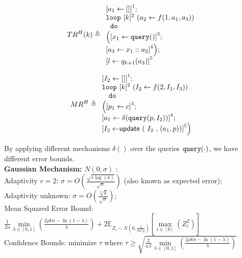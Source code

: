 \documentclass[a4paper,11pt]{article}
\begin{document}
\begin{example}
\[
TR^H(k) \triangleq
{
\begin{array}{l}
    \clabel{a_1 \leftarrow [] }^1; \\
    \eloop ~ [k]^{2} ~ (a_2 \leftarrow f(1, a_1, a_3)) \\
    ~ \edo ~ \\
    \Big(
     \clabel{x_1 \leftarrow \query() }^3 ; \\
    \clabel{a_3 \leftarrow x_1 :: a_2 }^4     \Big);\\
    \clabel{l \leftarrow q_{k + 1}(a_3)}^{5}\\
\end{array}
}
\]
\end{example}
%
\begin{example}
\[
MR^H \triangleq
\begin{array}{l}
    \left[I_2 \leftarrow [] \right]^1; \\
    \eloop ~ [k]^{2} ~ (I_2 \leftarrow f(2, I_1, I_3)) \\ 
    \ ~ \edo ~ \\ \Big(
    \left[p_1 \leftarrow c \right]^3 ; \\
    \left[a_1 \leftarrow \delta(\query(p, I_2)) \right]^4; \\
    \left[I_3 \leftarrow \eupdt( {I_2}, (a_1, p))  \right]^5
    \Big) 
\end{array}
\]
\end{example}
%
%
By applying different mechanisms $\delta()$ over the queries ${\tt query}(\cdot)$, we have different error bounds.
\\
\textbf{Gaussian Mechanism:} $N(0, \sigma)$ \cite{dwork2015preserving}:
\\
Adaptivity $r = 2$: 
$ \sigma = O \left(\frac{\sqrt{r \log(k)}}{\sqrt{n}} \right)$ (also known as expected error);
\\
Adaptivity unknown:
$ \sigma = O\left(\frac{\sqrt[4]{k}}{\sqrt{n}} \right)$;
\\
{Mean Squared Error Bound:} 
$ \frac{1}{2n} \min\limits_{\lambda \in [0, 1]}
\left( \frac{2\rho k n - \ln(1 - \lambda)}{\lambda} 
\right)
+ 2 \mathbb{E}_{Z_i \sim N(0, \frac{1}{2n^2 \rho})}
\left[ \max\limits_{i \in [k]} (Z_i^2) \right]$
%
\\
{Confidence Bounds:} minimize $\tau$ where
$\tau \geq \sqrt{\frac{2}{n \beta}
\min\limits_{\lambda \in [0, 1]}
\left( \frac{2\rho k n - \ln(1 - \lambda)}{\lambda} 
\right)
}$
\end{document}
